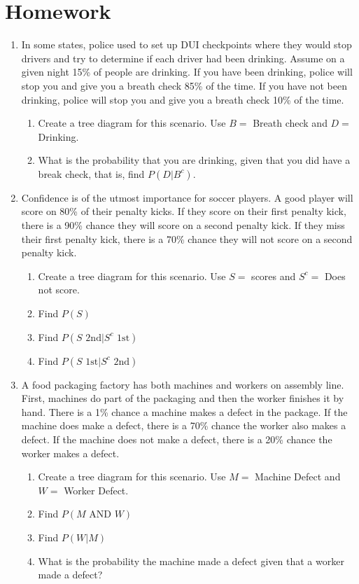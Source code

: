 \section{Homework}
\begin{enumerate}
 \item In some states, police used to set up DUI checkpoints where they would stop drivers and try to determine if each driver had been drinking.  Assume on a given night 15\% of people are drinking. If you have been drinking, police will stop you and give you a breath check 85\% of the time. If you have not been drinking, police will stop you and give you a breath check 10\% of the time.
 \begin{enumerate}
  \item Create a tree diagram for this scenario. Use \(B = \) Breath check and \(D = \) Drinking.
  \item What is the probability that you are drinking, given that you did have a break check, that is, find \(P(D|B^{c})\).
 \end{enumerate}
 \item Confidence is of the utmost importance for soccer players.  A good player will score on 80\% of their penalty kicks.  If they score on their first penalty kick, there is a 90\% chance they will score on a second penalty kick.  If they miss their first penalty kick, there is a 70\% chance they will not score on a second penalty kick.

\begin{center}
 \begin{enumerate}
  \item Create a tree diagram for this scenario. Use \(S =\) scores and \(S^{c} =\) Does not score.
  \item Find \(P(S)\)
  \item Find \(P(S \text{ 2nd} | S^{c} \text{ 1st})\)
  \item Find \(P(S \text{ 1st} | S^{c} \text { 2nd})\)
 \end{enumerate}
\end{center}

 \item A food packaging factory has both machines and workers on assembly line.  First, machines do part of the packaging and then the worker finishes it by hand.  There is a 1\% chance a machine makes a defect in the package.  If the machine does make a defect, there is a 70\% chance the worker also makes a defect.  If the machine does not make a defect, there is a 20\% chance the worker makes a defect.
 \begin{enumerate}
  \item Create a tree diagram for this scenario. Use \(M =\) Machine Defect and \(W =\) Worker Defect.
  \item Find \(P(M \text{ AND } W)\)
  \item Find \(P(W|M)\)
  \item What is the probability the machine made a defect given that a worker made a defect?
 \end{enumerate}


\end{enumerate}
